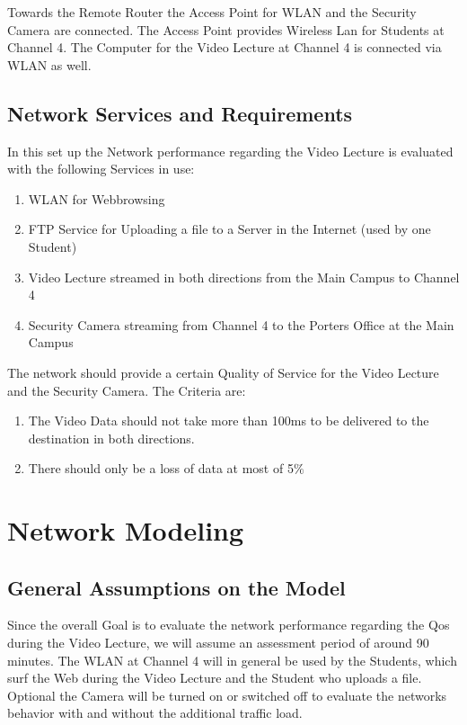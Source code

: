 \documentclass[a4paper,10pt]{book}\usepackage{graphicx}
\begin{document}
Towards the Remote Router the Access Point for WLAN and the Security Camera are connected.
The Access Point provides Wireless Lan for Students at Channel 4. The Computer for the Video Lecture at Channel 4 
is connected via WLAN as well.



\section{Network Services and Requirements}

In this set up the Network performance regarding the Video Lecture is evaluated with the following Services in
use:\\
\begin{enumerate}
 \item WLAN for Webbrowsing
 \item FTP Service for Uploading a file to a Server in the Internet (used by one Student) 
 \item Video Lecture streamed in both directions from the Main Campus to Channel 4
 \item Security Camera streaming from Channel 4 to the Porters Office  at the Main Campus
\end{enumerate}

The network should provide a certain Quality of Service for the Video Lecture and the Security Camera.
The Criteria are:\\
\begin{enumerate}
 \item The Video Data should not take more than 100ms to be delivered to the destination in both directions.
 \item There should only be a loss of data at most of 5$ \% $
\end{enumerate}

\chapter{Network Modeling}
\section{General Assumptions on the Model}
Since the overall Goal is to evaluate the network performance regarding the Qos during the Video Lecture, we will assume an assessment period
of around 90 minutes. The WLAN at Channel 4 will in general be used by the Students, which surf the Web during the Video Lecture and the Student 
who uploads a file. Optional the Camera will be turned on or switched off to evaluate the networks behavior with and without the additional
traffic load.
\end{document}
